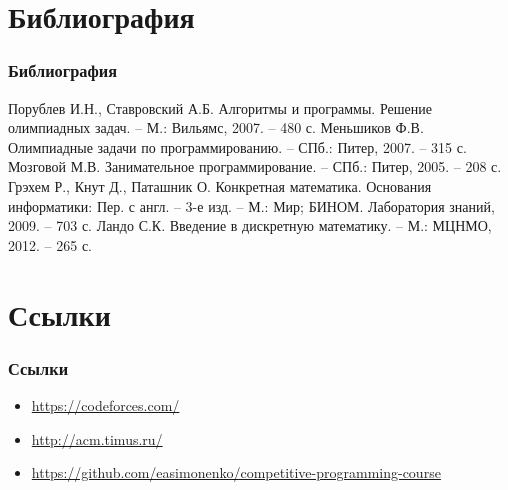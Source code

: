 \documentclass[11pt]{beamer}
\begin{document}
\section{Библиография}

\begin{frame}
\frametitle{Библиография}
\begin{thebibliography}{1}
   Порублев И.Н., Ставровский А.Б. Алгоритмы и программы.
  Решение олимпиадных задач. -- М.: Вильямс, 2007. -- 480 с.
   Меньшиков Ф.В. Олимпиадные задачи по программированию. -- СПб.: Питер,
  2007. -- 315 с.
   Мозговой М.В. Занимательное программирование. -- СПб.: Питер, 2005. -- 208 с.
   Грэхем Р., Кнут Д., Паташник О. Конкретная математика. Основания информатики: Пер. 
  с англ. -- 3-е изд. -- М.: Мир; БИНОМ. Лаборатория знаний, 2009. -- 703 с.
  \bibitem[Ландо]{} Ландо С.К. Введение в дискретную математику. -- М.: МЦНМО, 2012. -- 265 с.
\end{thebibliography}
\end{frame}

\section{Ссылки}

\begin{frame}
\frametitle{Ссылки}
\begin{itemize}
	\item \url{https://codeforces.com/}
	\item \url{http://acm.timus.ru/}
	\item \url{https://github.com/easimonenko/competitive-programming-course}
\end{itemize}
\end{frame}
\end{document}
